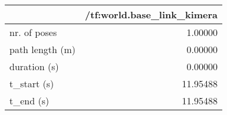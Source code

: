 \begin{tabular}{lr}
\toprule
{} &  /tf:world.base\_link\_kimera \\
\midrule
nr. of poses    &                     1.00000 \\
path length (m) &                     0.00000 \\
duration (s)    &                     0.00000 \\
t\_start (s)     &                    11.95488 \\
t\_end (s)       &                    11.95488 \\
\bottomrule
\end{tabular}
